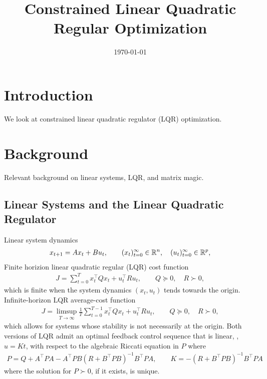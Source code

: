 \documentclass[12pt]{article}
\title{Constrained Linear Quadratic Regular Optimization}
\author{}
\date{\today}
\date{}
\begin{document}
\maketitle

\section{Introduction}
We look at constrained linear quadratic regulator (LQR) optimization.

\section{Background}
Relevant background on linear systems, LQR, and matrix magic.

\subsection{Linear Systems and the Linear Quadratic Regulator}
Linear system dynamics
\begin{align*}
  x_{t + 1} = A x_t + B u_t,
    \qquad (x_t)_{t = 0}^{\infty} \in {\mathbb{R}}^n,
    \quad (u_t)_{t = 0}^{\infty} \in {\mathbb{R}}^p,
\end{align*}
Finite horizion linear quadratic regular (LQR) cost function
\begin{align*}
  J = \sum_{t = 0}^{T} x_t ^\top Q x_t + u_t ^\top R u_t,
    \qquad
    Q \succeq 0, \quad R \succ 0,
\end{align*}
which is finite when the system dynamics \((x_t, u_t)\)
tends towards the origin.
Infinite-horizon LQR average-cost function
\begin{align*}
  J = \limsup_{T \to \infty} \frac{1}{T} \sum_{t = 0}^{T - 1}
        x_t ^\top Q x_t + u_t ^\top R u_t,
    \qquad
    Q \succeq 0, \quad R \succ 0,
\end{align*}
which allows for systems whose stability is not necessarily at the origin.
Both versions of LQR admit an optimal feedback control sequence
that is linear, \ie, \(u = Kt\),
with respect to the algebraic Riccati equation in \(P\) where
\begin{align*}
  P = Q + A^\top P A - A^\top P B (R + B^\top P B)^{-1} B^\top P A,
    \qquad K = -(R + B^\top P B)^{-1} B^\top P A
\end{align*}
where the solution for \(P \succ 0\), if it exists, is unique.
\end{document}
